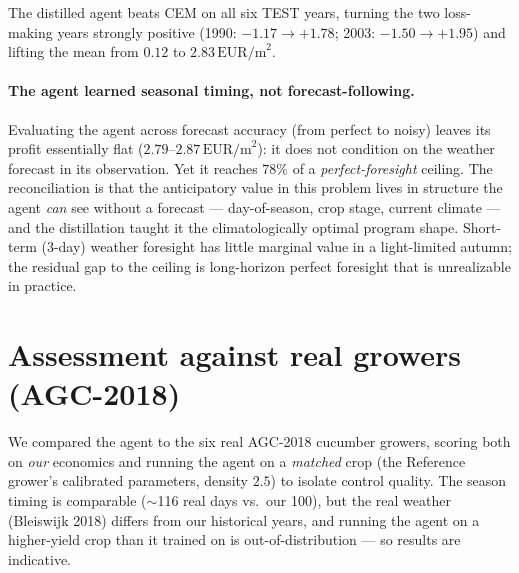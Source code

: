 \documentclass[11pt]{article}
\newcommand{\eurpm}{\,\text{EUR/m}^2}
\begin{document}
\noindent The distilled agent beats CEM on all six TEST years, turning the two
loss-making years strongly positive (1990: $-1.17\to+1.78$; 2003:
$-1.50\to+1.95$) and lifting the mean from $0.12$ to $2.83\eurpm$.

\paragraph{The agent learned seasonal timing, not forecast-following.}
Evaluating the agent across forecast accuracy (from perfect to noisy) leaves its
profit essentially flat ($2.79$--$2.87\eurpm$): it does not condition on the
weather forecast in its observation. Yet it reaches $78\%$ of a
\emph{perfect-foresight} ceiling. The reconciliation is that the anticipatory value
in this problem lives in structure the agent \emph{can} see without a forecast ---
day-of-season, crop stage, current climate --- and the distillation taught it the
climatologically optimal program shape. Short-term (3-day) weather foresight has
little marginal value in a light-limited autumn; the residual gap to the ceiling is
long-horizon perfect foresight that is unrealizable in practice.

\section{Assessment against real growers (AGC-2018)}
We compared the agent to the six real AGC-2018 cucumber growers, scoring both on
\emph{our} economics and running the agent on a \emph{matched} crop (the Reference
grower's calibrated parameters, density $2.5$) to isolate control quality. The
season timing is comparable ($\sim$116 real days vs.\ our 100), but the real weather
(Bleiswijk 2018) differs from our historical years, and running the agent on a
higher-yield crop than it trained on is out-of-distribution --- so results are
indicative.
\end{document}
